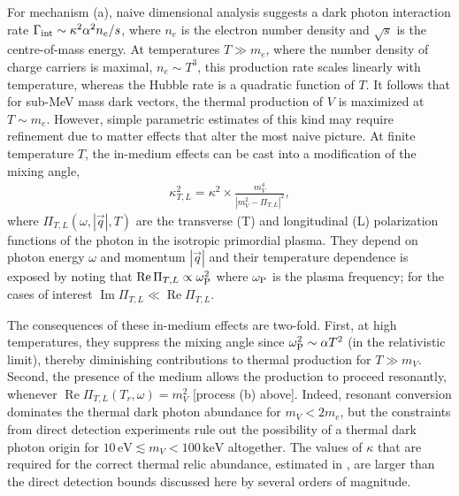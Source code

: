 \documentclass[prd,reprint,nofootinbib,notitlepage,aps,tightenlines,preprintnumbers,amsmath,amssymb,showpacs,superscriptaddress]{revtex4-1}
\newcommand{\eV}{\ensuremath{\mathrm{eV}}}
\newcommand{\keV}{\ensuremath{\mathrm{keV}}}
\DeclareMathOperator{\real}{Re}
\DeclareMathOperator{\imag}{Im}
\begin{document}
For mechanism (a), naive dimensional analysis suggests a dark photon
interaction rate
$\Gamma_{\rm int} \sim \kappa^2 \alpha^2 n_e/s$, where $n_e$ is
the electron number density and $\sqrt{s}$ is the centre-of-mass
energy. At temperatures $T\gg m_e$, where the number density of charge
carriers is maximal, $n_e\sim T^3$, this production rate scales
linearly with temperature, whereas the Hubble rate is a quadratic
function of $T$.  It follows that for sub-MeV mass dark vectors, the
thermal production of $V$ is maximized at $T\sim m_e$.  However,
simple parametric estimates of this kind may require refinement due to
matter effects that alter the most naive picture. At finite
temperature $T$, the in-medium effects can be cast into a modification
of the mixing angle,
%
\begin{align}
 \label{eq:kappa-eff}
  \kappa_{T,L}^2 = \kappa^2 \times \frac{m_V^4}{|m_V^2 - \Pi_{T,L}|^2},
\end{align}
%
where $\Pi_{T,L}(\omega, |\vec q|, T)$ are the transverse (T) and
longitudinal (L) polarization functions of the photon in the isotropic
primordial plasma. They depend on photon energy $\omega $ and momentum
$|\vec q|$ and their temperature dependence is exposed by noting that
$\real \Pi_{T,L} \propto \omega_{\rm P}^2$ where $\omega_{\rm P}$ is
the plasma frequency; for the cases of interest
$\imag \Pi_{T,L}\ll \real \Pi_{T,L} $.

The consequences of these in-medium effects are two-fold. First, at high
temperatures, they suppress the mixing angle since
$\omega_{\rm P}^2\sim \alpha T^2$ (in the relativistic limit), thereby
diminishing contributions to thermal production for $T\gg m_V$.
%
Second, the presence of the medium allows the production to proceed
resonantly, whenever $\real \Pi_{T,L}(T_r,\omega) = m_V^2$ [process
(b) above].  Indeed, resonant conversion dominates the thermal dark
photon abundance for $m_V < 2 m_e$, but the
constraints from direct detection experiments rule out the possibility
of a thermal dark photon origin for $10\,\eV \lesssim m_V < 100\,\keV$
altogether. The values of $\kappa$ that are required for the correct
thermal relic abundance, estimated in
\cite{Pospelov:2008jk,Redondo:2008ec}, are  larger than the direct
detection bounds discussed here by several orders of magnitude.
%
\end{document}
